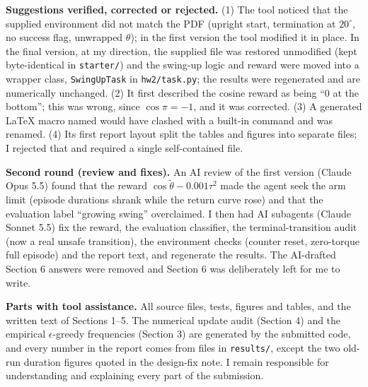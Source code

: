 \documentclass[11pt]{article}
\begin{document}
\textbf{Suggestions verified, corrected or rejected.} (1) The tool noticed that the supplied environment did not match the PDF (upright start, termination at $20^\circ$, no success flag, unwrapped $\theta$); in the first version the tool modified it in place. In the final version, at my direction, the supplied file was restored unmodified (kept byte-identical in \texttt{starter/}) and the swing-up logic and reward were moved into a wrapper class, \texttt{SwingUpTask} in \texttt{hw2/task.py}; the results were regenerated and are numerically unchanged. (2) It first described the cosine reward as being ``0 at the bottom''; this was wrong, since $\cos\pi=-1$, and it was corrected. (3) A generated LaTeX macro named \texttt{\string\alpha} would have clashed with a built-in command and was renamed. (4) Its first report layout split the tables and figures into separate files; I rejected that and required a single self-contained file.

\textbf{Second round (review and fixes).} An AI review of the first version (Claude Opus 5.5) found that the reward $\cos\widetilde\theta-0.001\tau^2$ made the agent seek the arm limit (episode durations shrank while the return curve rose) and that the evaluation label ``growing swing'' overclaimed. I then had AI subagents (Claude Sonnet 5.5) fix the reward, the evaluation classifier, the terminal-transition audit (now a real unsafe transition), the environment checks (counter reset, zero-torque full episode) and the report text, and regenerate the results. The AI-drafted Section 6 answers were removed and Section 6 was deliberately left for me to write.

\textbf{Parts with tool assistance.} All source files, tests, figures and tables, and the written text of Sections 1--5. The numerical update audit (Section 4) and the empirical $\epsilon$-greedy frequencies (Section 3) are generated by the submitted code, and every number in the report comes from files in \texttt{results/}, except the two old-run duration figures quoted in the design-fix note. I remain responsible for understanding and explaining every part of the submission.
\end{document}
